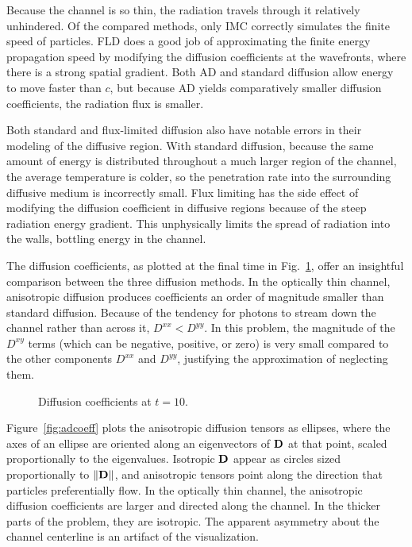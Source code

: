 \documentclass[11pt,letter,twoside]{mc2011}
\newcommand{\Dtens}{\mat{D}}
\begin{document}
Because the channel is so thin, the
radiation travels through it relatively unhindered. Of the compared methods,
only IMC correctly simulates the finite speed of particles. FLD does a good
job of approximating the finite energy propagation speed by modifying the
diffusion coefficients at the wavefronts, where there is a strong spatial
gradient. Both AD and standard diffusion allow energy to move faster than $c$,
but because AD yields comparatively smaller diffusion coefficients, the
radiation flux is smaller.

Both standard and flux-limited diffusion also have notable errors in their
modeling of the diffusive region.
With standard diffusion, because the same amount of energy is distributed
throughout a much larger region of the channel, the average temperature is
colder, so the penetration rate into the surrounding diffusive medium is
incorrectly small.  
Flux limiting has the side effect of modifying the diffusion coefficient
in diffusive regions because of the steep radiation energy gradient. This
unphysically limits the spread of radiation into the walls, bottling energy in
the channel.

The diffusion coefficients, as plotted at the final time in
Fig.~\ref{fig:dcoeffT10}, offer an insightful comparison between the three
diffusion methods. In the optically thin channel, anisotropic
diffusion produces coefficients an order of magnitude smaller than standard
diffusion. Because of the tendency for photons to stream down the channel
rather than across it, $D^{xx} < D^{yy}$.
In this problem, the magnitude of the $D^{xy}$ terms (which can be negative,
positive, or zero) is very small compared to the
other components $D^{xx}$ and $D^{yy}$, justifying the approximation of
neglecting them.  

\begin{figure}[htb]
  \centering
  \hspace{-1.25in}
  \hspace{-1.25in}
  \caption{Diffusion coefficients at $t=10$.}
  \label{fig:dcoeffT10}
\end{figure}

Figure~\ref{fig:adcoeff} plots the anisotropic diffusion tensors as
ellipses, where the axes of an ellipse are oriented along an eigenvectors of
$\Dtens$ at that point, scaled proportionally to the eigenvalues. Isotropic
$\Dtens$ appear as circles sized proportionally to $\norm{\Dtens}$, and
anisotropic tensors point along the direction that particles preferentially
flow. In the optically thin channel, the anisotropic diffusion coefficients are
larger and directed along the channel. In the thicker parts of the problem,
they are isotropic.
The apparent asymmetry about the channel centerline is an artifact of
the visualization.
\end{document}
